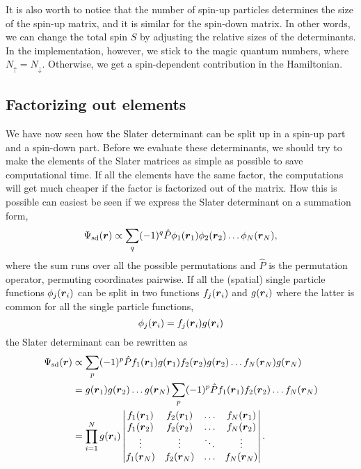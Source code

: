 It is also worth to notice that the number of spin-up particles determines the size of the spin-up matrix, and it is similar for the spin-down matrix. In other words, we can change the total spin $S$ by adjusting the relative sizes of the determinants. In the implementation, however, we stick to the magic quantum numbers, where $N_{\uparrow}=N_{\downarrow}$. Otherwise, we get a spin-dependent contribution in the Hamiltonian.

\subsection{Factorizing out elements} \label{sec:factorizing}
We have now seen how the Slater determinant can be split up in a spin-up part and a spin-down part. Before we evaluate these determinants, we should try to make the elements of the Slater matrices as simple as possible to save computational time. If all the elements have the same factor, the computations will get much cheaper if the factor is factorized out of the matrix. How this is possible can easiest be seen if we express the Slater determinant on a summation form,
\begin{equation}
\Psi_{\text{sd}}(\boldsymbol{{r}})\propto\sum_{q}(-1)^q\hat{P}\phi_1(\boldsymbol{{r}}_1)\phi_2(\boldsymbol{{r}}_2)\hdots\phi_N(\boldsymbol{{r}}_N),
\label{eq:slatersum}
\end{equation}
where the sum runs over all the possible permutations and $\hat{P}$ is the permutation operator, permuting coordinates pairwise. If all the (spatial) single particle functions $\phi_j(\boldsymbol{{r}}_i)$ can be split in two functions $f_j(\boldsymbol{{r}}_i)$ and $g(\boldsymbol{{r}}_i)$ where the latter is common for all the single particle functions,
\begin{equation}
\phi_j(\boldsymbol{{r}}_i)=f_j(\boldsymbol{{r}}_i)g(\boldsymbol{{r}}_i)
\end{equation}
the Slater determinant can be rewritten as
\begin{equation}
\begin{aligned}
\Psi_{\text{sd}}(\boldsymbol{{r}})&\propto\sum_{p}(-1)^p\hat{P}f_1(\boldsymbol{{r}}_1)g(\boldsymbol{{r}}_1)f_2(\boldsymbol{{r}}_2)g(\boldsymbol{{r}}_2)\hdots f_N(\boldsymbol{{r}}_N)g(\boldsymbol{{r}}_N)\\
&=g(\boldsymbol{{r}}_1)g(\boldsymbol{{r}}_2)\hdots g(\boldsymbol{{r}}_N)\sum_{p}(-1)^p\hat{P}f_1(\boldsymbol{{r}}_1)f_2(\boldsymbol{{r}}_2)\hdots f_N(\boldsymbol{{r}}_N)\\
&=\prod_{i=1}^Ng(\boldsymbol{{r}}_i)
\begin{vmatrix}
f_1(\boldsymbol{r}_1) & f_2(\boldsymbol{r}_1) & \hdots & f_N(\boldsymbol{r}_1)\\
f_1(\boldsymbol{r}_2) & f_2(\boldsymbol{r}_2) & \hdots & f_N(\boldsymbol{r}_2)\\
\vdots & \vdots & \ddots & \vdots \\
f_1(\boldsymbol{r}_N) & f_2(\boldsymbol{r}_N) & \hdots & f_N(\boldsymbol{r}_N)
\end{vmatrix}.
\end{aligned}
\end{equation}
